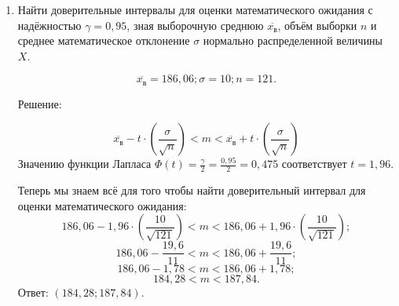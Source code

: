 \documentclass{article}
\begin{document}
\begin{enumerate}
\item %
Найти доверительные интервалы для оценки математического ожидания с надёжностью $\gamma=0,95$, зная выборочную среднюю $\overline{x_\textit{в}}$, объём выборки $n$ и среднее математическое отклонение $\sigma$ нормально распределенной величины $X$.

$$\overline{x_\textit{в}}=186,06; \sigma=10; n=121.$$
\begin{center}Решение:\end{center}
$$\overline{x_\textit{в}}-t\cdot\left(\frac{\sigma}{\sqrt{n}}\right)<m<\overline{x_\textit{в}}+t\cdot\left(\frac{\sigma}{\sqrt{n}}\right)$$
Значению функции Лапласа $\Phi(t)=\frac{\gamma}{2}=\frac{0,95}{2}=0,475$ соответствует $t=1,96$.

Теперь мы знаем всё для того чтобы найти доверительный интервал для оценки математического ожидания:
$$186,06-1,96\cdot\left(\frac{10}{\sqrt{121}}\right)<m<186,06+1,96\cdot\left(\frac{10}{\sqrt{121}}\right);$$
$$186,06-\frac{19,6}{11}<m<186,06+\frac{19,6}{11};$$
$$186,06-1,78<m<186,06+1,78;$$
$$184,28<m<187,84.$$
Ответ: $(184,28;187,84)$.

\end{enumerate}
\end{document}
